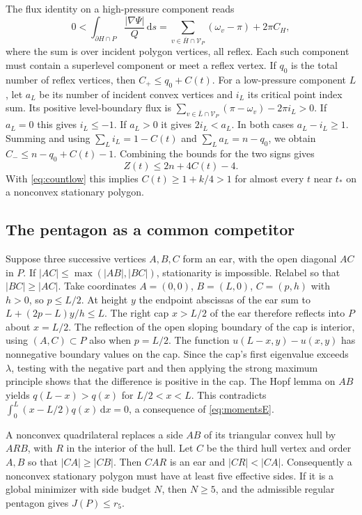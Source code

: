 \documentclass[11pt,a4paper,reqno]{amsart}
\theoremstyle{remark}
\numberwithin{equation}{section}
\newcommand{\dd}{\,\mathrm d}
\begin{document}
The flux identity on a high-pressure component reads
\[
 0<\int_{\partial H\cap P}\frac{|\nabla\Psi|}{Q}\dd s
  =\sum_{v\in\overline H\cap\mathcal V_P}(\omega_v-\pi)+2\pi C_H ,
\]
where the sum is over incident polygon vertices, all reflex. Each such
component must contain a superlevel component or meet a reflex vertex.
If $q_0$ is the total number of reflex vertices, then
$C_+\le q_0+C(t)$. For a low-pressure component $L$, let $a_L$ be its
number of incident convex vertices and $i_L$ its critical point index sum.
Its positive level-boundary flux is
$\sum_{v\in\bar L\cap\mathcal V_P}(\pi-\omega_v)-2\pi i_L>0$. If $a_L=0$ this gives
$i_L\le-1$. If $a_L>0$ it gives $2i_L<a_L$. In both cases
$a_L-i_L\ge1$. Summing and using $\sum_L i_L=1-C(t)$ and
$\sum_La_L=n-q_0$, we obtain $C_-\le n-q_0+C(t)-1$. Combining the bounds
for the two signs gives
\begin{equation}\label{eq:countup}
                        Z(t)\le 2n+4C(t)-4 .
\end{equation}
With \eqref{eq:countlow} this implies $C(t)\ge1+k/4>1$ for almost every
$t$ near $t_*$ on a nonconvex stationary polygon.

\subsection{The pentagon as a common competitor}
Suppose three successive vertices $A,B,C$ form an ear, with the open
diagonal $AC$ in $P$. If $|AC|\le\max(|AB|,|BC|)$, stationarity is
impossible. Relabel so that $|BC|\ge|AC|$. Take coordinates
$A=(0,0)$, $B=(L,0)$, $C=(p,h)$ with $h>0$, so $p\le L/2$. At height $y$
the endpoint abscissas of the ear sum to $L+(2p-L)y/h\le L$. The right
cap $x>L/2$ of the ear therefore reflects into $P$ about $x=L/2$.
The reflection of the open sloping boundary of the cap is interior, using
$(A,C)\subset P$ also when $p=L/2$. The function
$u(L-x,y)-u(x,y)$ has nonnegative boundary values on the cap. Since the
cap's first eigenvalue exceeds $\lambda$, testing with the negative part
and then applying the strong maximum principle shows that the difference
is positive in the cap. The Hopf lemma on $AB$ yields
$q(L-x)>q(x)$ for $L/2<x<L$. This contradicts
$\int_0^L(x-L/2)q(x)\dd x=0$, a consequence of \eqref{eq:momentsE}.

A nonconvex quadrilateral replaces a side $AB$ of its triangular convex
hull by $ARB$, with $R$ in the interior of the hull. Let $C$ be the
third hull vertex and order $A,B$ so that $|CA|\ge|CB|$. Then $CAR$ is
an ear and $|CR|<|CA|$. Consequently a nonconvex stationary polygon must
have at least five effective sides. If it is a global minimizer with side
budget $N$, then $N\ge5$, and the admissible regular pentagon gives
$J(P)\le r_5$.
\end{document}
